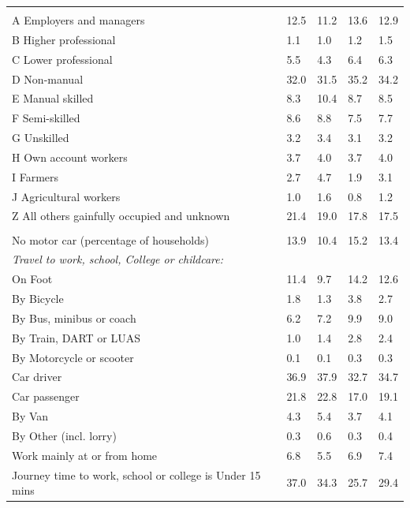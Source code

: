\documentclass{article}
\begin{document}
\begin{table}[h]
\begin{tabular}{KTTTT}
\hline
    \\ 
    \hline
A Employers and managers & 12.5& 11.2& 13.6& 12.9\\
B Higher professional & 1.1& 1.0& 1.2& 1.5\\
C Lower professional & 5.5& 4.3& 6.4& 6.3\\
D Non-manual & 32.0& 31.5& 35.2& 34.2\\
E Manual skilled &  8.3& 10.4&  8.7&  8.5\\
F Semi-skilled & 8.6& 8.8& 7.5& 7.7\\
G Unskilled & 3.2& 3.4& 3.1& 3.2\\
H Own account workers & 3.7& 4.0& 3.7& 4.0\\
I Farmers & 2.7& 4.7& 1.9& 3.1\\
J Agricultural workers & 1.0& 1.6& 0.8& 1.2\\
Z All others gainfully occupied and unknown & 21.4& 19.0& 17.8& 17.5\\
\hline
{}\hline
    \\ 
    \hline
No motor car (percentage of households) & 13.9& 10.4& 15.2& 
13.4\\
    \hline 
\emph{Travel to work, school, College or childcare:} & & & \\
\quad On Foot & 11.4&  9.7& 14.2& 12.6\\ 
\quad By Bicycle & 1.8& 1.3& 3.8& 2.7\\ 
\quad By Bus, minibus or coach & 6.2& 7.2& 9.9& 9.0\\
\quad By Train, DART or LUAS & 1.0& 1.4& 2.8& 2.4\\
\quad By Motorcycle or scooter & 0.1& 0.1& 0.3& 0.3\\
\quad Car driver & 36.9 & 37.9& 32.7& 34.7\\
\quad Car passenger & 21.8& 22.8& 17.0& 19.1\\
\quad By Van & 4.3& 5.4& 3.7& 4.1\\
\quad By Other (incl. lorry) & 0.3& 0.6& 0.3& 0.4\\
    \hline
Work mainly at or from home & 6.8& 5.5& 6.9& 7.4\\
Journey time to work, school or college is Under 15 mins & 37.0& 34.3& 25.7& 29.4\\

\end{tabular}
\end{table}
\end{document}
